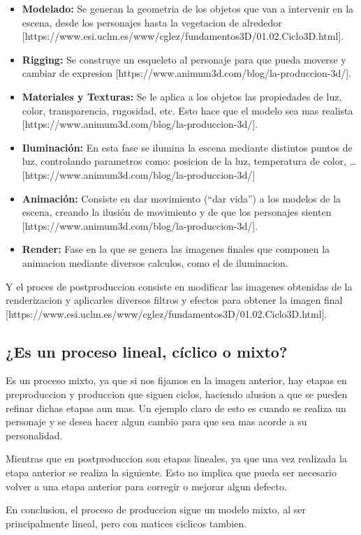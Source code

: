 \documentclass{article}
\begin{document}
\begin{itemize}
    \item \textbf{Modelado: }Se generan la geometria de los objetos que van a intervenir en la escena, desde los personajes hasta la vegetacion de alrededor [https://www.esi.uclm.es/www/cglez/fundamentos3D/01.02.Ciclo3D.html].
    \item \textbf{Rigging: }Se construye un esqueleto al personaje para que pueda moverse y cambiar de expresion [https://www.animum3d.com/blog/la-produccion-3d/].
    \item \textbf{Materiales y Texturas: }Se le aplica a los objetos las propiedades de luz, color, transparencia, rugosidad, etc. Esto hace que el modelo sea mas realista [https://www.animum3d.com/blog/la-produccion-3d/].
    \item \textbf{Iluminación: }En esta fase se ilumina la escena mediante distintos puntos de luz, controlando parametros como: posicion de la luz, temperatura de color, \dots [https://www.animum3d.com/blog/la-produccion-3d/]
    \item \textbf{Animación: }Consiste en dar movimiento (``dar vida'') a los modelos de la escena, creando la ilusión de movimiento y de que los personajes sienten [https://www.animum3d.com/blog/la-produccion-3d/].
    \item \textbf{Render: }Fase en la que se genera las imagenes finales que componen la animacion mediante diversos calculos, como el de iluminacion.
\end{itemize}

Y el proces de postproduccion consiste en modificar las imagenes obtenidas de la renderizacion y aplicarles diversos filtros y efectos para obtener la imagen final [https://www.esi.uclm.es/www/cglez/fundamentos3D/01.02.Ciclo3D.html].

\subsection{¿Es un proceso lineal, cíclico o mixto?}
Es un proceso mixto, ya que si nos fijamos en la imagen anterior, hay etapas en preproduccion y produccion que siguen ciclos, haciendo alusion a que se pueden refinar dichas etapas aun mas. Un ejemplo claro de esto es cuando se realiza un personaje y se desea hacer algun cambio para que sea mas acorde a su personalidad.

Mientras que en postproduccion son etapas lineales, ya que una vez realizada la etapa anterior se realiza la siguiente. Esto no implica que pueda ser necesario volver a una etapa anterior para corregir o mejorar algun defecto.

En conclusion, el proceso de produccion sigue un modelo mixto, al ser principalmente lineal, pero con matices ciclicos tambien.
\end{document}
